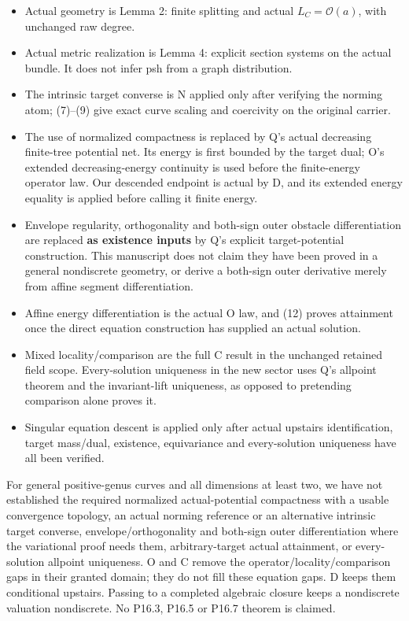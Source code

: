 \documentclass[
  11pt,
]{article}
\providecommand{\tightlist}{%
  \setlength{\itemsep}{0pt}\setlength{\parskip}{0pt}}
\begin{document}
\begin{itemize}
\tightlist
\item
  Actual geometry is Lemma 2: finite splitting and actual
  \(L_C=\mathcal O(a)\), with unchanged raw degree.
\item
  Actual metric realization is Lemma 4: explicit section systems on the
  actual bundle. It does not infer psh from a graph distribution.
\item
  The intrinsic target converse is N applied only after verifying the
  norming atom; (7)--(9) give exact curve scaling and coercivity on the
  original carrier.
\item
  The use of normalized compactness is replaced by Q's actual decreasing
  finite-tree potential net. Its energy is first bounded by the target
  dual; O's extended decreasing-energy continuity is used before the
  finite-energy operator law. Our descended endpoint is actual by D, and
  its extended energy equality is applied before calling it finite
  energy.
\item
  Envelope regularity, orthogonality and both-sign outer obstacle
  differentiation are replaced \textbf{as existence inputs} by Q's
  explicit target-potential construction. This manuscript does not claim
  they have been proved in a general nondiscrete geometry, or derive a
  both-sign outer derivative merely from affine segment differentiation.
\item
  Affine energy differentiation is the actual O law, and (12) proves
  attainment once the direct equation construction has supplied an
  actual solution.
\item
  Mixed locality/comparison are the full C result in the unchanged
  retained field scope. Every-solution uniqueness in the new sector uses
  Q's allpoint theorem and the invariant-lift uniqueness, as opposed to
  pretending comparison alone proves it.
\item
  Singular equation descent is applied only after actual upstairs
  identification, target mass/dual, existence, equivariance and
  every-solution uniqueness have all been verified.
\end{itemize}

For general positive-genus curves and all dimensions at least two, we
have not established the required normalized actual-potential
compactness with a usable convergence topology, an actual norming
reference or an alternative intrinsic target converse,
envelope/orthogonality and both-sign outer differentiation where the
variational proof needs them, arbitrary-target actual attainment, or
every-solution allpoint uniqueness. O and C remove the
operator/locality/comparison gaps in their granted domain; they do not
fill these equation gaps. D keeps them conditional upstairs. Passing to
a completed algebraic closure keeps a nondiscrete valuation nondiscrete.
No P16.3, P16.5 or P16.7 theorem is claimed.
\end{document}

